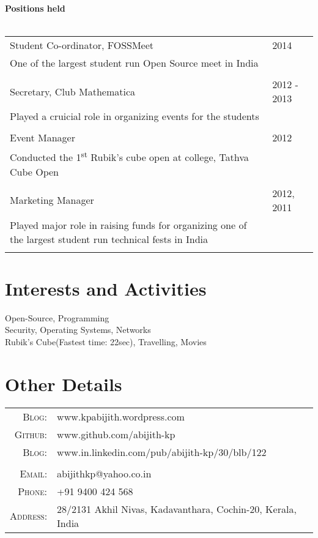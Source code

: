 \documentclass[a4paper,10pt]{article} %
\begin{document}
\textbf{Positions held}\\ \\
\begin{tabular}{p{11cm}p{11cm}}
Student Co-ordinator, FOSSMeet & 2014 \\
One of the largest student run Open Source meet in India & \\ \\
Secretary, Club Mathematica & 2012 - 2013 \\
Played a cruicial role in organizing events for the students & \\ \\
Event Manager & 2012 \\
Conducted the 1\textsuperscript{st} Rubik's cube open at college, Tathva Cube Open& \\ \\
Marketing Manager & 2012, 2011 \\
Played major role in raising funds for organizing one of the largest student run technical fests in India & \\ \\
\end{tabular}

\section{Interests and Activities}

Open-Source, Programming\\
Security, Operating Systems, Networks\\
Rubik's Cube(Fastest time: 22sec), Travelling, Movies


\section{Other Details}

\begin{tabular}{rl}
\textsc{Blog:} & www.kpabijith.wordpress.com \\
\textsc{Github:} & www.github.com/abijith-kp \\
\textsc{Blog:} & www.in.linkedin.com/pub/abijith-kp/30/blb/122 \\ \\
\textsc{Email:} & abijithkp@yahoo.co.in \\
\textsc{Phone:} & +91 9400 424 568\\
\textsc{Address:} & 28/2131 Akhil Nivas, Kadavanthara, Cochin-20, Kerala, India \\
\end{tabular}
\end{document}
